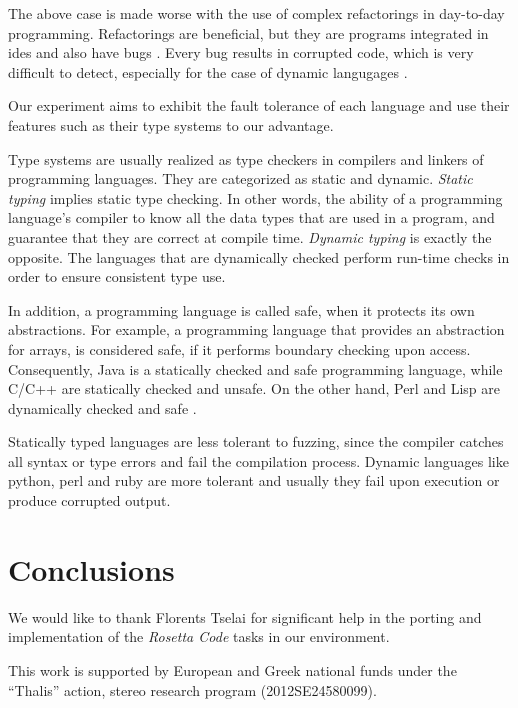 \documentclass[10pt]{sigplanconf}
\begin{document}
The above case is made worse with the use of complex refactorings \cite{Fow00} in day-to-day programming. Refactorings are beneficial, but they are programs integrated in {\sc ide}s and also have bugs \cite{DDGM07}. Every bug results in corrupted code, which is very difficult to detect, especially for the case of dynamic langugages \cite{SCHA12,FFM11}.

Our experiment aims to exhibit the fault tolerance \cite{LYU95,KOKR07} of each language and use their features such as 
their type systems to our advantage. 

Type systems are usually realized as type checkers in compilers and linkers of programming languages. They are categorized as static and dynamic. \textit{Static typing} implies static type checking. In other words, the ability of a programming language's compiler to know all the data types that are used in a program, and guarantee that they are correct at compile time. \textit{Dynamic typing} is exactly the opposite. The languages that are dynamically checked perform run-time checks in order to ensure consistent type use. 

In addition, a programming language is called safe, when it protects its own abstractions. For example, a programming language that provides an abstraction for arrays, is considered safe, if it performs boundary checking upon access. Consequently, Java is a statically checked and safe programming language, while C/C++ are statically checked and unsafe. On the other hand, Perl and Lisp are dynamically checked and safe \cite{Pie02}.

Statically typed languages are less tolerant to fuzzing, since the compiler catches all syntax or type errors and fail the compilation process. Dynamic languages like python, perl and ruby are more tolerant and usually they fail upon execution or produce corrupted output.

\section{Conclusions} %
\label{sec:conclusions}


\acks

We would like to thank Florents Tselai for significant
help in the porting and implementation of the
{\em Rosetta Code} tasks in our environment.

This work is supported by European and Greek national funds
under the ``Thalis'' action, {\sc stereo} research program
(2012SE24580099).
\end{document}
